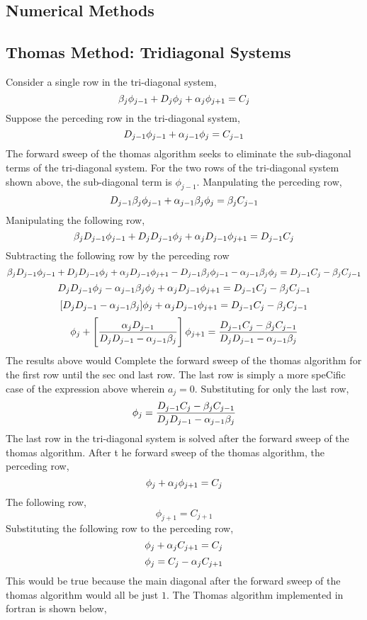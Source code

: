 \documentclass[a4paper, 12pt]{report}
\begin{document}
\begin{center}
\chapter{Numerical Methods}
\begin{comment}
\end{comment}
\section{Thomas Method: Tridiagonal Systems}
\begin{comment}
\end{comment}

Consider a single row in the tri-diagonal system,
$$\beta_j\phi_{j-1} + D_j\phi_{j} + \alpha_j\phi_{j+1} = C_j$$
Suppose the perceding row in the tri-diagonal system,
$$D_{j-1}\phi_{j-1} + \alpha_{j-1}\phi_{j} = C_{j-1}$$
The forward sweep of the thomas algorithm seeks to eliminate the sub-diagonal terms of the tri-diagonal system. For the two rows of the tri-diagonal system shown above, the sub-diagonal term is $\phi_{j-1}$. Manpulating the perceding row,
$$D_{j-1}\beta_j\phi_{j-1} + \alpha_{j-1}\beta_j\phi_{j} = \beta_jC_{j-1}$$
Manipulating the following row,
$$\beta_jD_{j-1}\phi_{j-1} + D_jD_{j-1}\phi_{j} + \alpha_jD_{j-1}\phi_{j+1} = D_{j-1}C_j$$
Subtracting the following row by the perceding row
$$\beta_jD_{j-1}\phi_{j-1} + D_jD_{j-1}\phi_{j} + \alpha_jD_{j-1}\phi_{j+1} - D_{j-1}\beta_j\phi_{j-1} - \alpha_{j-1}\beta_j\phi_{j} = D_{j-1}C_j - \beta_jC_{j-1}$$
$$D_jD_{j-1}\phi_{j} - \alpha_{j-1}\beta_j\phi_{j} + \alpha_jD_{j-1}\phi_{j+1} = D_{j-1}C_j - \beta_jC_{j-1}$$
$$[D_jD_{j-1} - \alpha_{j-1}\beta_j]\phi_{j} + \alpha_jD_{j-1}\phi_{j+1} = D_{j-1}C_j - \beta_jC_{j-1}$$
$$\phi_{j} + \left[\frac{\alpha_jD_{j-1}}{D_jD_{j-1} - \alpha_{j-1}\beta_j}\right]\phi_{j+1} = \frac{D_{j-1}C_j - \beta_jC_{j-1}}{D_jD_{j-1} - \alpha_{j-1}\beta_j}$$  
The results above would Complete the forward sweep of the thomas algorithm for the first row until the sec
ond last row. The last row is simply a more speCific case of the expression above wherein $a_j = 0$. Substituting for only the last row,
$$\phi_{j} = \frac{D_{j-1}C_j - \beta_jC_{j-1}}{D_jD_{j-1} - \alpha_{j-1}\beta_j}$$
The last row in the tri-diagonal system is solved after the forward sweep of the thomas algorithm. After t
he forward sweep of the thomas algorithm, the perceding row,
$$\phi_{j} + \alpha_{j}\phi_{j+1} = C_{j}$$
The following row,
$$\phi_{j+1} = C_{j+1}$$
Substituting the following row to the perceding row,
$$\phi_{j} + \alpha_{j}C_{j+1} = C_{j}$$
$$\phi_{j} = C_{j} - \alpha_{j}C_{j+1}$$
This would be true because the main diagonal after the forward sweep of the thomas algorithm would all be just $1$. The Thomas algorithm implemented in fortran is shown below,
\end{center}
\end{document}
